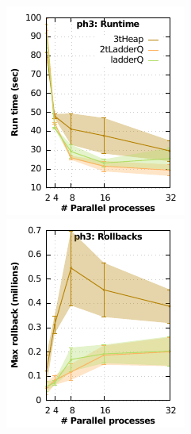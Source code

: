 \begin{figure}
\begin{minipage}{0.5\linewidth}
\begin{minipage}{0.49\linewidth}
\includegraphics[width=\linewidth]{images/ph3_Delay_10_Evt_10_run_time}
\end{minipage}
\begin{minipage}{0.49\linewidth}
\includegraphics[width=\linewidth]{images/ph3_Delay_10_Evt_10_rollbacks}

\end{minipage}
\end{minipage}
\end{figure}

